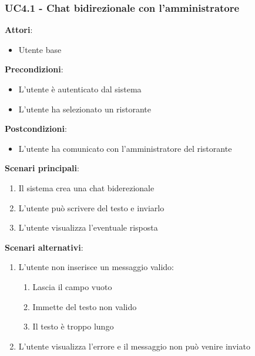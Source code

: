 \subsubsection{UC4.1 - Chat bidirezionale con l'amministratore}\label{usecase:4_1}
\textbf{Attori}:
\begin{itemize}
    \item Utente base
\end{itemize}
\textbf{Precondizioni}:
\begin{itemize}
    \item L'utente è autenticato dal sistema
    \item L'utente ha selezionato un ristorante
\end{itemize}
\textbf{Postcondizioni}:
\begin{itemize}
    \item L'utente ha comunicato con l'amministratore del ristorante
\end{itemize}
\textbf{Scenari principali}:
\begin{enumerate}
    \item Il sistema crea una chat biderezionale
    \item L'utente può scrivere del testo e inviarlo
    \item L'utente visualizza l'eventuale risposta
\end{enumerate}
\textbf{Scenari alternativi}:
\begin{enumerate}
    \item L'utente non inserisce un messaggio valido:
    \begin{enumerate}
        \item Lascia il campo vuoto
        \item Immette del testo non valido
        \item Il testo è troppo lungo
    \end{enumerate}
    \item L'utente visualizza l'errore e il messaggio non può venire inviato
\end{enumerate}